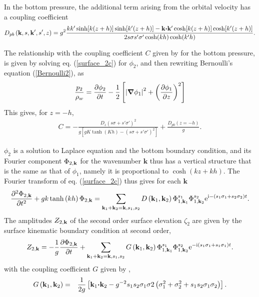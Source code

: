In the bottom pressure, the additional term arising from the orbital velocity has a coupling coefficient
\begin{eqnarray}
 D_{pb} \left(\mathbf{k},s,\mathbf{k^{\prime}},s',z\right)  = 
    g^2 \frac{k k' \sinh[k(z+h)]\sinh[k'(z+h)] -  \mathbf{k} \mbox{\boldmath $\cdot$} \mathbf{k^{\prime}}  \cosh[k(z+h)]\cosh[k'(z+h)]}
{2 s \sigma s' \sigma' \cosh(kh) \cosh(k'h)}. \nonumber \\  \label{Dpb}
\end{eqnarray}

The relationship with the coupling coefficient $C$ given by \citet[][their eq. 4]{Herbers&Guza1991} for the bottom pressure,
is given by solving eq. (\ref{surface_2c}) for $\phi_2$, and then rewriting Bernoulli's equation (\ref{Bernoulli2}), as 
\begin{equation}
  \frac{p_2}{\rho_w} = \frac{\partial \phi_2}{\partial t} 
                         - \frac{1}{2}\left[
                                            \left|\mbox{\boldmath $\nabla$} \phi_1\right|^2
                                         +\left(\frac{\partial \phi_1}{\partial z}\right)^2\right]
\label{Bernoulli21}
\end{equation}
This gives, for $z=-h$,  
 \begin{eqnarray}
 C=-\frac{D_z(s\sigma + s' \sigma')^2 }{g \left[ g K \tanh(Kh) - (s \sigma + s' \sigma')^2 \right]} +  \frac{D_{pb}(z=-h)}{g}. 
 \end{eqnarray}

$\phi_2$ is a solution to  Laplace equation and the bottom boundary condition, and its Fourier component $\Phi _{2,\mathbf{k}}$ for the wavenumber $\mathbf{k}$ 
thus has a vertical structure that is the same as that of  $\phi_1$, namely it is proportional to $\cosh\left(kz+kh\right)$. The Fourier 
transform of eq. (\ref{surface_2c}) thus gives for each ${\mathbf k}$
\begin{equation}
\frac{\partial ^{2}\Phi _{2,\mathbf{k}}}{\partial t^{2}}
    +gk\tanh\left(kh\right) \Phi _{2,\mathbf{k}}
    =\sum_{{\mathbf k_1}+{\mathbf k_2}=\mathbf{k},s_1,s_2}
     D\left({\mathbf k_1},{\mathbf k_2}\right)
    \Phi _{1,\mathbf{k}_1}^{s_1}\Phi _{1,\mathbf{k}_2}^{s_2} \mathrm{e}^{\mathrm{i}
     - \left(s_1 \sigma_1+s_2 \sigma_2  \right) t}.\label{surface 2c}
\end{equation}
The amplitudes $Z_{2,\mathbf{k}}$ of the second order surface elevation $\zeta_2$ are given by the surface 
kinematic boundary condition at second order,
\begin{equation}
Z_{2,\mathbf{k}}=-\frac{1}{g} \frac{\partial \Phi _{2,{\mathbf
k}}}{\partial t}
    +\sum_{{\mathbf k_1}+{\mathbf k_2}=\mathbf{k},s_1,s_2}
     G\left({\mathbf k_1},{\mathbf k_2}\right)
    \Phi _{1,\mathbf{k}_1}^{s_1}\Phi _{1,\mathbf{k}_2}^{s_2} \mathrm{e}^{-\mathrm{i}
    \left(s_1 \sigma_1+s_1 \sigma_1 \right) t
    }.\label{Snl}
\end{equation}
with the coupling coefficient $G$ given by \cite{Hasselmann1962},
\begin{eqnarray}
    G\left({\mathbf k_1},{\mathbf k_2}\right) & = &
    \frac{1}{2g}\left[\mathbf{k}_1 \mbox{\boldmath $\cdot$} \mathbf{k}_2
    -g^{-2} s_1 s_2 \sigma_1 \sigma2\left(\sigma_1^2+\sigma_2^2+ s_1 s_2 \sigma_1 \sigma_2\right)\right]
    .
\end{eqnarray}


